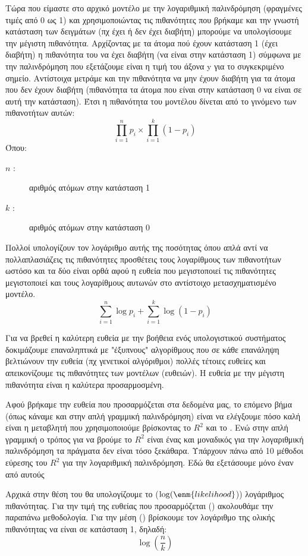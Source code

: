 Τώρα που είμαστε στο αρχικό μοντέλο με την λογαριθμική παλινδρόμηση (φραγμένες τιμές
από 0 ως 1) και χρησιμοποιώντας τις πιθανότητες που βρήκαμε και την γνωστή κατάσταση
των δειγμάτων (πχ έχει ή δεν έχει διαβήτη) μπορούμε να υπολογίσουμε την μέγιστη
πιθανότητα. Αρχίζοντας με τα άτομα πού έχουν κατάσταση 1 (έχει διαβήτη) η πιθανότητα του
να έχει διαβήτη (να είναι στην κατάσταση 1) σύμφωνα με την παλινδρόμηση που εξετάζουμε
είναι η τιμή του άξονα y για το συγκεκριμένο σημείο. Αντίστοιχα μετράμε και την πιθανότητα
να μην έχουν διαβήτη για τα άτομα που δεν έχουν διαβήτη (πιθανότητα τα άτομα που είναι
στην κατάσταση 0 να είναι σε αυτή την κατάσταση). Έτσι η πιθανότητα του μοντέλου δίνεται
από το γινόμενο των πιθανοτήτων αυτών:
$$\prod\limits_{i=1}^np_i\times\prod\limits_{i=1}^k(1-p_i)$$
Όπου:
\begin{description}
    \item[$n$ :] αριθμός ατόμων στην κατάσταση 1
    \item[$k$ :] αριθμός ατόμων στην κατάσταση 0
\end{description}

Πολλοί υπολογίζουν τον λογάριθμο αυτής της ποσότητας όπου απλά αντί να
πολλαπλασιάζεις τις πιθανότητες προσθέτεις τους λογαρίθμους των πιθανοτήτων ωστόσο
και τα δύο είναι ορθά αφού η ευθεία που μεγιστοποιεί τις πιθανότητες μεγιστοποιεί και τους
λογαρίθμους αυτωνών στο αντίστοιχο μετασχηματισμένο μοντέλο.
$$\sum\limits_{i=1}^n\log p_i+\sum\limits_{i=1}^k\log(1-p_i)$$

Για να βρεθεί η καλύτερη ευθεία με την βοήθεια ενός υπολογιστικού συστήματος
δοκιμάζουμε επαναληπτικά με "έξυπνους" αλγορίθμους που σε κάθε επανάληψη
βελτιώνουν την ευθεία (πχ γενετικοί αλγόριθμοι) πολλές τέτοιες ευθείες και απεικονίζουμε
τις πιθανότητες των μοντέλων (ευθειών). Η ευθεία με την μέγιστη πιθανότητα είναι η
καλύτερα προσαρμοσμένη.

Αφού βρήκαμε την ευθεία που προσαρμόζεται στα δεδομένα μας, το επόμενο βήμα (όπως
κάναμε και στην απλή γραμμική παλινδρόμηση) είναι να ελέγξουμε πόσο καλή είναι η
μεταβλητή που χρησιμοποιούμε βρίσκοντας το $R^2$
και το . Ενώ στην απλή γραμμική ο
τρόπος για να βρούμε το $R^2$
είναι ένας και μοναδικός για την λογαριθμική παλινδρόμηση τα
πράγματα δεν είναι τόσο ξεκάθαρα. Υπάρχουν πάνω από 10 μέθοδοι εύρεσης του $R^2$
για την
λογαριθμική παλινδρόμηση. Εδώ θα εξετάσουμε μόνο έναν από αυτούς

Αρχικά στην θέση του  θα υπολογίζουμε το  ($\log(\enm{likelihood}$)) λογάριθμος πιθανότητας.
Για την τιμή  της ευθείας που προσαρμόζεται () ακολουθάμε την παραπάνω μεθοδολογία.
Για την μέση () βρίσκουμε τον λογάριθμο της ολικής πιθανότητας να είναι σε κατάσταση
1, δηλαδή:
$$\log\left(\frac{n}{k}\right)$$

